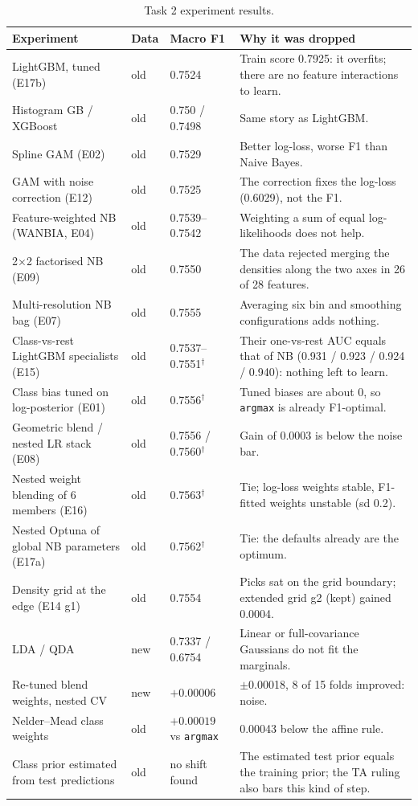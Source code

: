 \documentclass[../main.tex]{subfiles}
\begin{document}
\begin{table}[H]\centering\small
\begin{tabular}{@{}L{.30\linewidth}L{.07\linewidth}L{.17\linewidth}L{.36\linewidth}@{}}
\toprule
\textbf{Experiment} & \textbf{Data} & \textbf{Macro F1} & \textbf{Why it was dropped} \\
\midrule
LightGBM, tuned (E17b) & old & 0.7524 & Train score 0.7925: it overfits; there are no feature interactions to learn. \\
Histogram GB / XGBoost & old & 0.750 / 0.7498 & Same story as LightGBM. \\
Spline GAM \citep{splines} (E02) & old & 0.7529 & Better log-loss, worse F1 than Naive Bayes. \\
GAM with noise correction (E12) & old & 0.7525 & The correction fixes the log-loss (0.6029), not the F1. \\
Feature-weighted NB (WANBIA, E04) & old & 0.7539--0.7542 & Weighting a sum of equal log-likelihoods does not help. \\
2$\times$2 factorised NB (E09) & old & 0.7550 & The data rejected merging the densities along the two axes in 26 of 28 features. \\
Multi-resolution NB bag (E07) & old & 0.7555 & Averaging six bin and smoothing configurations adds nothing. \\
Class-vs-rest LightGBM specialists (E15) & old & 0.7537--0.7551$^\dagger$ & Their one-vs-rest AUC equals that of NB (0.931 / 0.923 / 0.924 / 0.940): nothing left to learn. \\
Class bias tuned on log-posterior (E01) & old & 0.7556$^\dagger$ & Tuned biases are about 0, so \texttt{argmax} is already F1-optimal. \\
Geometric blend / nested LR stack (E08) & old & 0.7556 / 0.7560$^\dagger$ & Gain of 0.0003 is below the noise bar. \\
Nested weight blending of 6 members (E16) & old & 0.7563$^\dagger$ & Tie; log-loss weights stable, F1-fitted weights unstable (sd 0.2). \\
Nested Optuna of global NB parameters (E17a) & old & 0.7562$^\dagger$ & Tie: the defaults already are the optimum. \\
Density grid at the edge (E14 g1) & old & 0.7554 & Picks sat on the grid boundary; extended grid g2 (kept) gained 0.0004. \\
LDA / QDA & new & 0.7337 / 0.6754 & Linear or full-covariance Gaussians do not fit the marginals. \\
Re-tuned blend weights, nested CV & new & $+0.00006$ & $\pm$0.00018, 8 of 15 folds improved: noise. \\
Nelder--Mead class weights & old & $+0.00019$ vs \texttt{argmax} & 0.00043 below the affine rule. \\
Class prior estimated from test predictions \citep{saerens} & old & no shift found & The estimated test prior equals the training prior; the TA ruling also bars this kind of step. \\
\bottomrule
\end{tabular}
\caption{Task 2 experiment results.}\label{tab:t2-failed}
\end{table}
\end{document}
